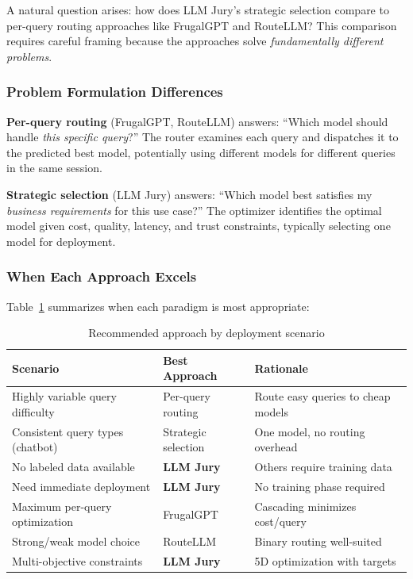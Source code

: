 \documentclass[11pt,a4paper]{article}
\begin{document}
A natural question arises: how does LLM Jury's strategic selection compare to per-query routing approaches like FrugalGPT and RouteLLM? This comparison requires careful framing because the approaches solve \textit{fundamentally different problems}.

\subsubsection{Problem Formulation Differences}

\textbf{Per-query routing} (FrugalGPT, RouteLLM) answers: ``Which model should handle \textit{this specific query}?'' The router examines each query and dispatches it to the predicted best model, potentially using different models for different queries in the same session.

\textbf{Strategic selection} (LLM Jury) answers: ``Which model best satisfies my \textit{business requirements} for this use case?'' The optimizer identifies the optimal model given cost, quality, latency, and trust constraints, typically selecting one model for deployment.

\subsubsection{When Each Approach Excels}

Table~\ref{tab:approach_scenarios} summarizes when each paradigm is most appropriate:

\begin{table}[h]
\centering
\caption{Recommended approach by deployment scenario}
\label{tab:approach_scenarios}
\small
\begin{tabular}{@{}lll@{}}
\toprule
\textbf{Scenario} & \textbf{Best Approach} & \textbf{Rationale} \\
\midrule
Highly variable query difficulty & Per-query routing & Route easy queries to cheap models \\
Consistent query types (chatbot) & Strategic selection & One model, no routing overhead \\
No labeled data available & \textbf{LLM Jury} & Others require training data \\
Need immediate deployment & \textbf{LLM Jury} & No training phase required \\
Maximum per-query optimization & FrugalGPT & Cascading minimizes cost/query \\
Strong/weak model choice & RouteLLM & Binary routing well-suited \\
Multi-objective constraints & \textbf{LLM Jury} & 5D optimization with targets \\
\bottomrule
\end{tabular}
\end{table}
\end{document}
